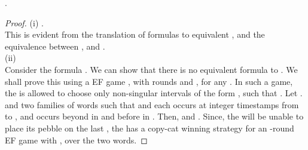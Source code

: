 \documentclass{llncs}
\newcommand{\POTDFA}{\mbox{}}
\newcommand{\bmitlfp}{\mbox{}}
\newcommand{\potdfa}{\POTDFA}
\newcommand{\ttl}{\mbox{}}
\newcommand{\ssp}{\mbox{}}
\newcommand{\ddp}{\mbox{}}
\newcommand{\mitlfpinf}{\mbox{}}
\newcommand{\mitlfpb}{\bmitlfp}
\begin{document}
\begin{theorem}
\label{thm:express1}
\mitlfpb\/  \mitlfpinf.
\end{theorem}
\begin{proof}
(i) \mitlfpb\/  \mitlfpinf.\\
This is evident from the translation of \mitlfpb\/ formulas to equivalent \potdfa, and the equivalence between \potdfa, \ttl\/ and \mitlfpinf.\\
(ii) \mitlfpinf  \mitlfpb\\
Consider the \mitlfpinf\/ formula . We can show that there is no equivalent \mitlfpb\/ formula to .
We shall prove this using a \mitlfpb\/ EF game \cite{PS11}, with  rounds and , for any . In such a game, the \ssp\/ is allowed to choose only non-singular intervals of the form , such that . Let .  and  two families of words such that  and each  occurs at integer timestamps from  to , and  occurs beyond  in  and before  in . Then,  and . Since, the \ssp\/ will be unable to place its pebble on the last , the \ddp\/ has a copy-cat winning strategy for an -round \mitlfpb\/ EF game with , over the two words. 
\end{proof}
\end{document}
